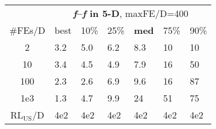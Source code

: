 \begin{tabular}{c|llllll}
 & \multicolumn{6}{|c}{\textbf{\textit{f}\raisebox{-0.35ex}{1}--\textit{f}\raisebox{-0.35ex}{24} in 5-D}, maxFE/D=400}\\
\#FEs/D & best & 10\% & 25\% & \textbf{med} & 75\% & 90\%\\
2 & \hspace*{1ex}3.2 & \hspace*{1ex}5.0 & \hspace*{1ex}6.2 & \hspace*{1ex}8.3 & 10 & 10\\
10 & \hspace*{1ex}3.4 & \hspace*{1ex}4.5 & \hspace*{1ex}4.9 & \hspace*{1ex}7.9 & 16 & 50\\
100 & \hspace*{1ex}2.3 & \hspace*{1ex}2.6 & \hspace*{1ex}6.9 & \hspace*{1ex}9.6 & 16 & 87\\
1e3 & \hspace*{1ex}1.3 & \hspace*{1ex}4.7 & \hspace*{1ex}9.9 & 24 & 51 & 75\\
$\text{RL}_{\text{US}}$/D & 4e2 & 4e2 & 4e2 & 4e2 & 4e2 & 4e2
\end{tabular}
